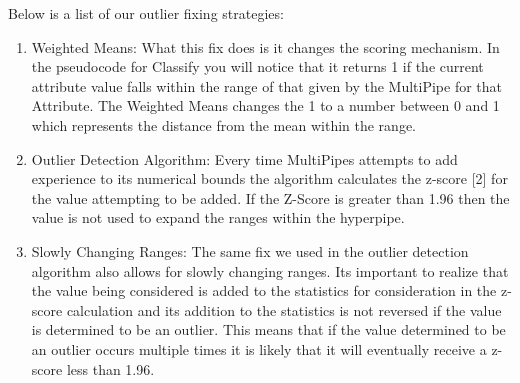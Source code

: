 \begin{kasten}
{Below is a list of our outlier fixing 
strategies:
\begin{enumerate}
\item Weighted Means: What this fix 
does is it changes the scoring mechanism. In the pseudocode for 
Classify you will notice that it returns 1 if the current attribute 
value falls within the range of that given by the MultiPipe for that 
Attribute. The Weighted Means changes the 1 to a number between 0 
and 1 which represents the distance from the mean within the range. 
\item Outlier Detection Algorithm: 
Every time MultiPipes attempts to add experience to its numerical bounds
the algorithm calculates the z-score [2] for the value attempting to be added. 
If the Z-Score is greater than 1.96 then the value is not used to expand
the ranges within the hyperpipe.
\item Slowly Changing Ranges: 
The same fix we used in the outlier detection algorithm also allows for 
slowly changing ranges. Its important to realize that the value being
considered is added to the statistics for consideration in the z-score 
calculation and its addition to the statistics is not reversed if the
value is determined to be an outlier. This means that if the value 
determined to be an outlier occurs multiple times it is likely that 
it will eventually receive a z-score less than 1.96.
\end{enumerate}
    }
\end{kasten}

